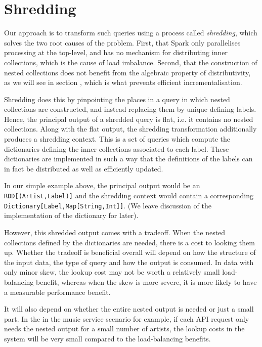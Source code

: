 \section{Shredding} {

Our approach is to transform such queries using a process called \textit{shredding}, which solves the two root causes of the problem. First, that Spark only parallelises processing at the top-level, and has no mechanism for distributing inner collections, which is the cause of load imbalance.  Second, that the construction of nested collections does not benefit from the algebraic property of distributivity, as we will see in section \cite{}, which is what prevents efficient incrementalisation.

Shredding does this by pinpointing the places in a query in which nested collections are constructed, and instead replacing them by unique defining labels. Hence, the principal output of a shredded query is flat, i.e. it contains no nested collections. Along with the flat output, the shredding transformation additionally produces a shredding context. This is a set of queries which compute the dictionaries defining the inner collections associated to each label. These dictionaries are implemented in such a way that the definitions of the labels can in fact be distributed as well as efficiently updated.

In our simple example above, the principal output would be an \lstinline{RDD[(Artist,Label)]} and the shredding context would contain a corresponding \lstinline{Dictionary[Label,Map[String,Int]]}. (We leave discussion of the implementation of the dictionary for later).

However, this shredded output comes with a tradeoff. When the nested collections defined by the dictionaries are needed, there is a cost to looking them up. Whether the tradeoff is beneficial overall will depend on how the structure of the input data, the type of query and how the output is consumed. In data with only minor skew, the lookup cost may not be worth a relatively small load-balancing benefit, whereas when the skew is more severe, it is more likely to have a measurable performance benefit.

It will also depend on whether the entire nested output is needed or just a small part. In the in the music service scenario for example, if each API request only needs the nested output for a small number of artists, the lookup costs in the system will be very small compared to the load-balancing benefits.

}

